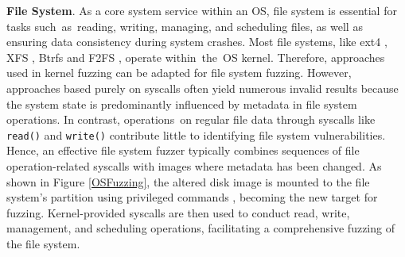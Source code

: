 \textbf{File System}. As a core system service within an OS, file system is essential for tasks such~as~reading, writing, managing, and scheduling files, as well as ensuring data consistency during system crashes. Most file systems, like ext4 \cite{Cao2007Ext4TN}, XFS \cite{XFS2018}, Btrfs \cite{Rodeh2013BTRFSTL} and F2FS \cite{Lee2015F2FSAN}, operate within~the~OS kernel. Therefore, approaches used in kernel fuzzing can be adapted for file system fuzzing. However, approaches based purely on syscalls often yield numerous invalid results because the system state is predominantly influenced by metadata in file system operations. In contrast, operations~on regular file data through syscalls like \texttt{read()} and \texttt{write()} contribute little to identifying file system vulnerabilities. Hence, an effective file system fuzzer typically combines sequences of file operation-related syscalls  with images  where metadata has been changed. As shown in Figure \ref{OSFuzzing}, the altered disk image is mounted to the file system's partition using privileged commands \cite{schumilo2017kafl, Hydra2020finding}, becoming the new target for fuzzing. Kernel-provided syscalls are then used to conduct read, write, management, and scheduling operations, facilitating a comprehensive fuzzing of the file system.

